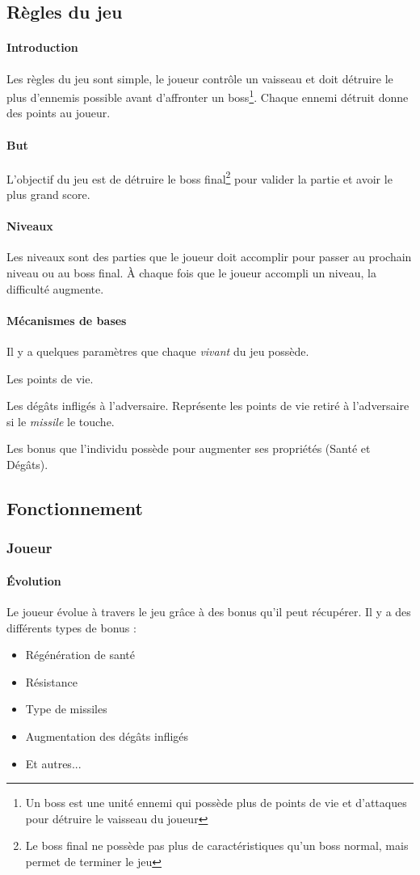 \documentclass[11pt, a4paper, oneside]{article}
\begin{document}
\subsection{Règles du jeu}
\paragraph{Introduction}
Les règles du jeu sont simple, le joueur contrôle un vaisseau et doit détruire le plus d'ennemis possible avant d'affronter un boss\footnote{Un boss est une unité ennemi qui possède plus de points de vie et d'attaques pour détruire le vaisseau du joueur}. Chaque ennemi détruit donne des points au joueur.
\paragraph{But}
L'objectif du jeu est de détruire le boss final\footnote{Le boss final ne possède pas plus de caractéristiques qu'un boss normal, mais permet de terminer le jeu} pour valider la partie et avoir le plus grand score.
\paragraph{Niveaux}
Les niveaux sont des parties que le joueur doit accomplir pour passer au prochain niveau ou au boss final. À chaque fois que le joueur accompli un niveau, la difficulté augmente.
\paragraph{Mécanismes de bases}
Il y a quelques paramètres que chaque \emph{vivant} du jeu possède.
\begin{description}
\setlength{\itemindent}{-.cm}
	\item[— Santé] Les points de vie.
	\item[— Dégâts] Les dégâts infligés à l'adversaire. Représente les points de vie retiré à l'adversaire si le \emph{missile} le touche.
	\item[— Bonus] Les bonus que l'individu possède pour augmenter ses propriétés (Santé et Dégâts).
\end{description}
\subsection{Fonctionnement}
\subsubsection{Joueur}
\paragraph{Évolution}
Le joueur évolue à travers le jeu grâce à des bonus qu'il peut récupérer. Il y a des différents types de bonus :
\begin{itemize}
	\item Régénération de santé
	\item Résistance
	\item Type de missiles
	\item Augmentation des dégâts infligés
	\item Et autres...
\end{itemize}
\end{document}
